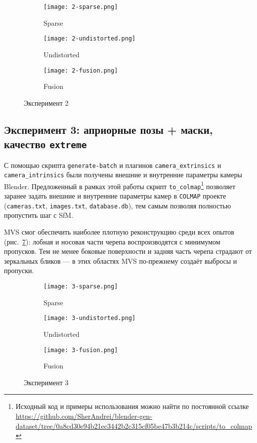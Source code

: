 \begin{figure}[h]
    \centering
    \begin{subfigure}[b]{0.3\textwidth}
        \texttt{[image: 2-sparse.png]}
        \caption{Sparse}
        \label{fig:2sparse}
    \end{subfigure}
    \hfill
    \begin{subfigure}[b]{0.3\textwidth}
        \texttt{[image: 2-undistorted.png]}
        \caption{Undistorted}
        \label{fig:2undistorted}
    \end{subfigure}
    \hfill
    \begin{subfigure}[b]{0.3\textwidth}
        \texttt{[image: 2-fusion.png]}
        \caption{Fusion}
        \label{fig:2fusion}
    \end{subfigure}
    \caption{Эксперимент 2}
    \label{fig:2exp}
\end{figure}

\subsection{Эксперимент 3: априорные позы + маски, качество \texttt{extreme}}

С помощью скрипта \texttt{generate-batch} и плагинов
\texttt{camera\_extrinsics} и \texttt{camera\_intrinsics} были получены внешние
и внутренние параметры камеры Blender. Предложенный в рамках этой работы скрипт
\texttt{to\_colmap}\footnote{Исходный код и примеры использования можно найти по
постоянной ссылке
\url{https://github.com/SherAndrei/blender-gen-dataset/tree/0a8cd30e94b21ec3442b2c315cf05be47b3b214c/scripts/to_colmap}}
позволяет заранее задать внешние и внутренние параметры камер в \texttt{COLMAP}
проекте (\texttt{cameras.txt}, \texttt{images.txt}, \texttt{database.db}), тем
самым позволяя полностью пропустить шаг с SfM.

MVS смог обеспечить наиболее плотную реконструкцию среди всех опытов
(рис.~\ref{fig:3fusion}): лобная и носовая части черепа воспроизводятся с
минимумом пропусков. Тем не менее боковые поверхности и задняя часть черепа
страдают от зеркальных бликов — в этих областях MVS по‑прежнему создаёт выбросы
и пропуски.

\begin{figure}[h]
    \centering
    \begin{subfigure}[b]{0.3\textwidth}
        \texttt{[image: 3-sparse.png]}
        \caption{Sparse}
        \label{fig:3sparse}
    \end{subfigure}
    \hfill
    \begin{subfigure}[b]{0.3\textwidth}
        \texttt{[image: 3-undistorted.png]}
        \caption{Undistorted}
        \label{fig:3undistorted}
    \end{subfigure}
    \hfill
    \begin{subfigure}[b]{0.3\textwidth}
        \texttt{[image: 3-fusion.png]}
        \caption{Fusion}
        \label{fig:3fusion}
    \end{subfigure}
    \caption{Эксперимент 3}
    \label{fig:3exp}
\end{figure}

